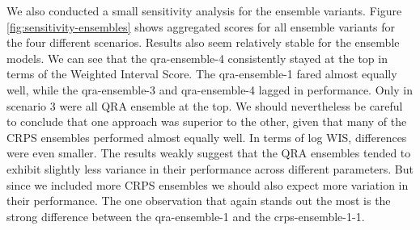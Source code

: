 \documentclass[
]{book}
\begin{document}
We also conducted a small sensitivity analysis for the ensemble variants. Figure \ref{fig:sensitivity-ensembles} shows aggregated scores for all ensemble variants for the four different scenarios. Results also seem relatively stable for the ensemble models. We can see that the qra-ensemble-4 consistently stayed at the top in terms of the Weighted Interval Score. The qra-ensemble-1 fared almost equally well, while the qra-ensemble-3 and qra-ensemble-4 lagged in performance. Only in scenario 3 were all QRA ensemble at the top. We should nevertheless be careful to conclude that one approach was superior to the other, given that many of the CRPS ensembles performed almost equally well. In terms of log WIS, differences were even smaller. The results weakly suggest that the QRA ensembles tended to exhibit slightly less variance in their performance across different parameters. But since we included more CRPS ensembles we should also expect more variation in their performance. The one observation that again stands out the most is the strong difference between the qra-ensemble-1 and the crps-ensemble-1-1.
\end{document}

